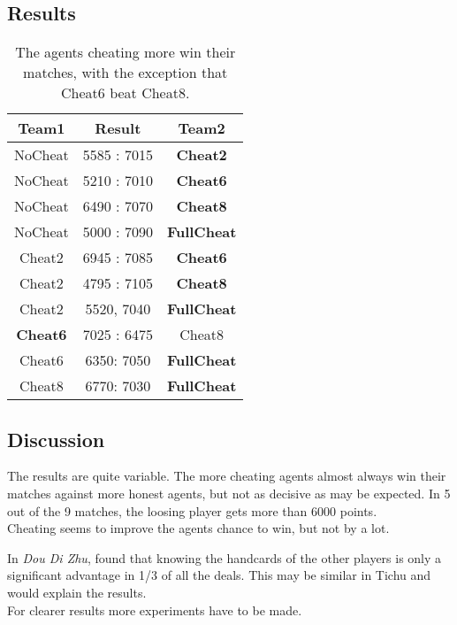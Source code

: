\subsection*{Results}
\begin{table}[h!]
  \centering

  \begin{tabular}{ccc}
    \textbf{Team1} & \textbf{Result}  & \textbf{Team2}\\
    \hline
    NoCheat & 5585 : 7015 & \textbf{Cheat2}\\
    \hline
    NoCheat & 5210 : 7010 & \textbf{Cheat6}\\
    \hline
    NoCheat & 6490 : 7070 & \textbf{Cheat8}\\
    \hline
    NoCheat & 5000 : 7090& \textbf{FullCheat}\\
    \hline

    Cheat2 &  6945 : 7085& \textbf{Cheat6}\\
    \hline
    Cheat2 &  4795 : 7105 & \textbf{Cheat8}\\
    \hline
    Cheat2 &  5520, 7040 & \textbf{FullCheat}\\

    \hline
    \textbf{Cheat6} & 7025 : 6475  & Cheat8\\
    \hline
    Cheat6 & 6350: 7050  & \textbf{FullCheat}\\

    \hline
    Cheat8 & 6770: 7030  & \textbf{FullCheat}\\
    \hline
  \end{tabular}
  \caption[Result of the Cheating Tournament]{The agents cheating more win their matches, with the exception that Cheat6 beat Cheat8.}
\end{table}

\subsection*{Discussion}
The results are quite variable. The more cheating agents almost always win their matches against more honest agents, but not as decisive as may be expected. In 5 out of the 9 matches, the loosing player gets more than 6000 points.\\
Cheating seems to improve the agents chance to win, but not by a lot.

In \textit{Dou Di Zhu}, \cite{ismcts} found that knowing the handcards of the other players is only a significant advantage in 1/3 of all the deals. This may be similar in Tichu and would explain the results.\\
For clearer results more experiments have to be made.


